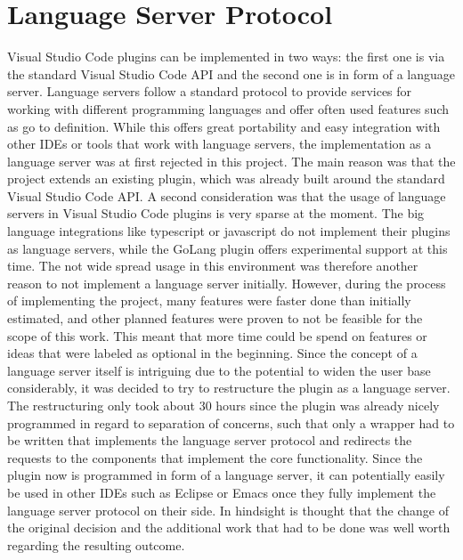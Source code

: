\section{Language Server Protocol}

Visual Studio Code plugins can be implemented in two ways: the first one is via the standard Visual Studio Code API and the second one is in form of a language server. Language servers follow a standard protocol to provide services for working with different programming languages and offer often used features such as go to definition. While this offers great portability and easy integration with other IDEs or tools that work with language servers, the implementation as a language server was at first rejected in this project. \newline
The main reason was that the project extends an existing plugin, which was already built around the standard Visual Studio Code API. A second consideration was that the usage of language servers in Visual Studio Code plugins is very sparse at the moment. The big language integrations like typescript or javascript do not implement their plugins as language servers, while the GoLang plugin offers experimental support at this time. The not wide spread usage in this environment was therefore another reason to not implement a language server initially. \newline
However, during the process of implementing the project, many features were faster done than initially estimated, and other planned features were proven to not be feasible for the scope of this work. This meant that more time could be spend on features or ideas that were labeled as optional in the beginning. Since the concept of a language server itself is intriguing due to the potential to widen the user base considerably, it was decided to try to restructure the plugin as a language server. \newline
The restructuring only took about 30 hours since the plugin was already nicely programmed in regard to separation of concerns, such that only a wrapper had to be written that implements the language server protocol and redirects the requests to the components that implement the core functionality. 
Since the plugin now is programmed in form of a language server, it can potentially easily be used in other IDEs such as Eclipse or Emacs once they fully implement the language server protocol on their side. In hindsight is thought that the change of the original decision and the additional work that had to be done was well worth regarding the resulting outcome. \newline

